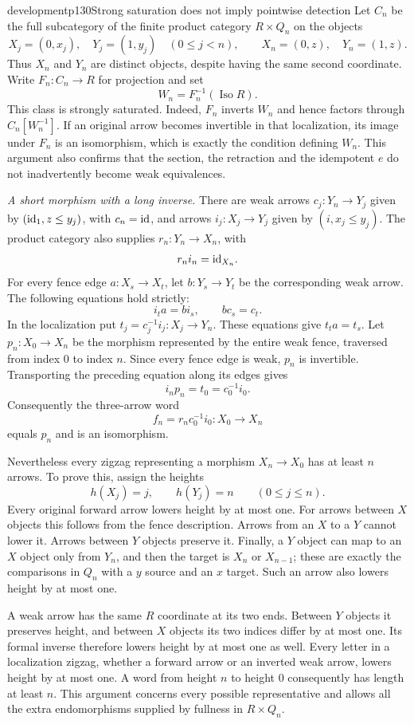 \begin{dcomment}{development}{p130}{Strong saturation does not imply pointwise detection}
Let $C_n$ be the full subcategory of the finite product category $R\times Q_n$ on the objects
\[
 X_j=(0,x_j),\quad Y_j=(1,y_j)\quad(0\leq j<n),\qquad
 X_n=(0,z),\quad Y_n=(1,z).
\]
Thus $X_n$ and $Y_n$ are distinct objects, despite having the same second coordinate. Write $F_n:C_n\to R$ for projection and set
\[
 W_n=F_n^{-1}(\operatorname{Iso}R).
\]
This class is strongly saturated. Indeed, $F_n$ inverts $W_n$ and hence factors through $C_n[W_n^{-1}]$. If an original arrow becomes invertible in that localization, its image under $F_n$ is an isomorphism, which is exactly the condition defining $W_n$. This argument also confirms that the section, the retraction and the idempotent $e$ do not inadvertently become weak equivalences.

\textit{A short morphism with a long inverse.}
There are weak arrows $c_j:Y_n\to Y_j$ given by $(\mathrm{id}_1,z\leq y_j)$, with $c_n=\mathrm{id}$, and arrows $i_j:X_j\to Y_j$ given by $(i,x_j\leq y_j)$. The product category also supplies $r_n:Y_n\to X_n$, with
\[
 r_ni_n=\mathrm{id}_{X_n}.
\]
For every fence edge $a:X_s\to X_t$, let $b:Y_s\to Y_t$ be the corresponding weak arrow. The following equations hold strictly:
\[
 i_ta=bi_s,\qquad bc_s=c_t.
\]
In the localization put $t_j=c_j^{-1}i_j:X_j\to Y_n$. These equations give $t_ta=t_s$. Let $p_n:X_0\to X_n$ be the morphism represented by the entire weak fence, traversed from index $0$ to index $n$. Since every fence edge is weak, $p_n$ is invertible. Transporting the preceding equation along its edges gives
\[
 i_np_n=t_0=c_0^{-1}i_0.
\]
Consequently the three-arrow word
\[
 f_n=r_nc_0^{-1}i_0:X_0\longrightarrow X_n
\]
equals $p_n$ and is an isomorphism.

Nevertheless every zigzag representing a morphism $X_n\to X_0$ has at least $n$ arrows. To prove this, assign the heights
\[
 h(X_j)=j,\qquad h(Y_j)=n\qquad(0\leq j\leq n).
\]
Every original forward arrow lowers height by at most one. For arrows between $X$ objects this follows from the fence description. Arrows from an $X$ to a $Y$ cannot lower it. Arrows between $Y$ objects preserve it. Finally, a $Y$ object can map to an $X$ object only from $Y_n$, and then the target is $X_n$ or $X_{n-1}$; these are exactly the comparisons in $Q_n$ with a $y$ source and an $x$ target. Such an arrow also lowers height by at most one.

A weak arrow has the same $R$ coordinate at its two ends. Between $Y$ objects it preserves height, and between $X$ objects its two indices differ by at most one. Its formal inverse therefore lowers height by at most one as well. Every letter in a localization zigzag, whether a forward arrow or an inverted weak arrow, lowers height by at most one. A word from height $n$ to height $0$ consequently has length at least $n$. This argument concerns every possible representative and allows all the extra endomorphisms supplied by fullness in $R\times Q_n$.


\end{dcomment}

